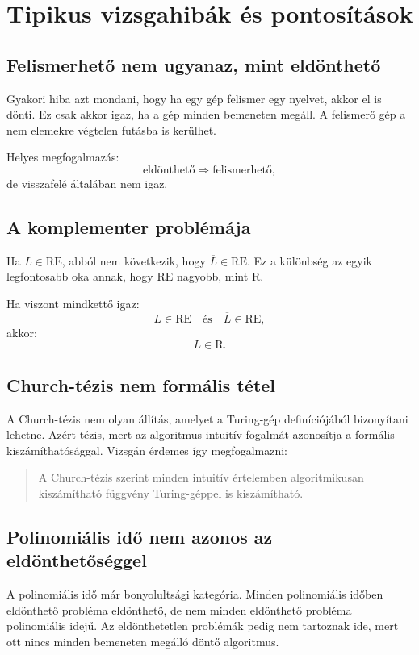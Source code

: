 \section{Tipikus vizsgahibák és pontosítások}

\subsection{Felismerhető nem ugyanaz, mint eldönthető}

Gyakori hiba azt mondani, hogy ha egy gép felismer egy nyelvet, akkor el is dönti. Ez csak akkor igaz, ha a gép minden bemeneten megáll. A felismerő gép a nem elemekre végtelen futásba is kerülhet.

Helyes megfogalmazás:
\[
  \text{eldönthető} \Rightarrow \text{felismerhető},
\]
de visszafelé általában nem igaz.

\subsection{A komplementer problémája}

Ha $L\in\mathrm{RE}$, abból nem következik, hogy $\overline L\in\mathrm{RE}$. Ez a különbség az egyik legfontosabb oka annak, hogy $\mathrm{RE}$ nagyobb, mint $\mathrm{R}$.

Ha viszont mindkettő igaz:
\[
  L\in\mathrm{RE}\quad\text{és}\quad\overline L\in\mathrm{RE},
\]
akkor:
\[
  L\in\mathrm{R}.
\]

\subsection{Church-tézis nem formális tétel}

A Church-tézis nem olyan állítás, amelyet a Turing-gép definíciójából bizonyítani lehetne. Azért tézis, mert az algoritmus intuitív fogalmát azonosítja a formális kiszámíthatósággal. Vizsgán érdemes így megfogalmazni:

\begin{quote}
A Church-tézis szerint minden intuitív értelemben algoritmikusan kiszámítható függvény Turing-géppel is kiszámítható.
\end{quote}

\subsection{Polinomiális idő nem azonos az eldönthetőséggel}

A polinomiális idő már bonyolultsági kategória. Minden polinomiális időben eldönthető probléma eldönthető, de nem minden eldönthető probléma polinomiális idejű. Az eldönthetetlen problémák pedig nem tartoznak ide, mert ott nincs minden bemeneten megálló döntő algoritmus.

